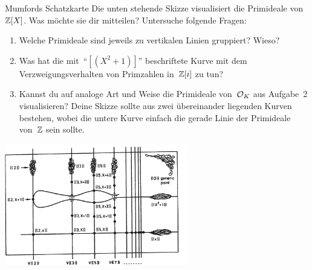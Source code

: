 \documentclass[entwurf]{uebblatt}
\begin{document}
\begin{aufgabe}{Mumfords Schatzkarte}
Die unten stehende Skizze visualisiert die Primideale von~$\mathbb{Z}[X]$.
Was möchte sie dir mitteilen? Untersuche folgende Fragen:
\begin{enumerate}
\item Welche Primideale sind jeweils zu vertikalen Linien gruppiert? Wieso?
\item Was hat die mit~"`$[(X^2+1)]$"' beschriftete Kurve mit dem
Verzweigungsverhalten von Primzahlen in~$\mathbb{Z}[i]$ zu tun?
\item Kannst du auf analoge Art und Weise die Primideale von~$\mathcal{O}_K$ aus
Aufgabe~2 visualisieren? Deine Skizze sollte aus zwei übereinander liegenden
Kurven bestehen, wobei die untere Kurve einfach die gerade Linie der Primideale
von~$\mathbb{Z}$ sein sollte.
\end{enumerate}
\centering\includegraphics[width=0.6\textwidth]{images/mumfords-treasure-map}\par
\end{aufgabe}
\end{document}
